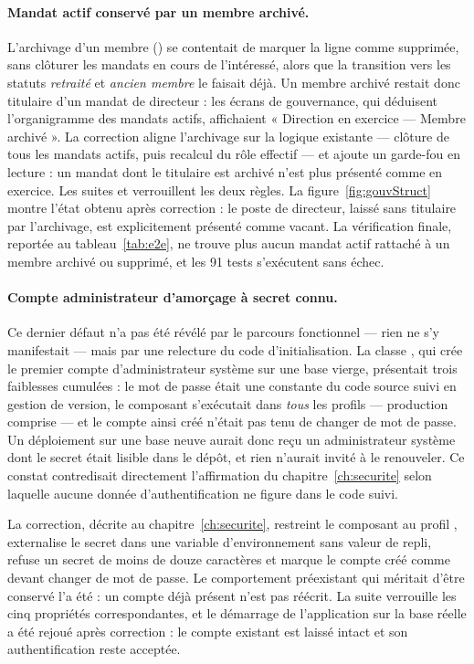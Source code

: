 \paragraph{Mandat actif conservé par un membre archivé.} L'archivage d'un membre
() se contentait de marquer la ligne comme supprimée, sans
clôturer les mandats en cours de l'intéressé, alors que la transition vers les statuts
\emph{retraité} et \emph{ancien membre} le faisait déjà. Un membre archivé restait
donc titulaire d'un mandat de directeur : les écrans de gouvernance, qui déduisent
l'organigramme des mandats actifs, affichaient « Direction en exercice --- Membre archivé ».
La correction aligne l'archivage sur la logique existante --- clôture de tous les mandats
actifs, puis recalcul du rôle effectif --- et ajoute un garde-fou en lecture : un mandat
dont le titulaire est archivé n'est plus présenté comme en exercice. Les suites
 et  verrouillent les deux règles. La
figure~\ref{fig:gouvStruct} montre l'état obtenu après correction : le poste de directeur,
laissé sans titulaire par l'archivage, est explicitement présenté comme vacant. La
vérification finale, reportée au tableau~\ref{tab:e2e}, ne trouve plus aucun mandat actif
rattaché à un membre archivé ou supprimé, et les 91 tests s'exécutent sans échec.

\paragraph{Compte administrateur d'amorçage à secret connu.} Ce dernier défaut n'a pas été
révélé par le parcours fonctionnel --- rien ne s'y manifestait --- mais par une relecture
du code d'initialisation. La classe , qui crée le premier
compte d'administrateur système sur une base vierge, présentait trois faiblesses
cumulées : le mot de passe était une constante du code source suivi en gestion de version,
le composant s'exécutait dans \emph{tous} les profils --- production comprise --- et le
compte ainsi créé n'était pas tenu de changer de mot de passe. Un déploiement sur une base
neuve aurait donc reçu un administrateur système dont le secret était lisible dans le
dépôt, et rien n'aurait invité à le renouveler. Ce constat contredisait directement
l'affirmation du chapitre~\ref{ch:securite} selon laquelle aucune donnée
d'authentification ne figure dans le code suivi.

La correction, décrite au chapitre~\ref{ch:securite}, restreint le composant au profil
, externalise le secret dans une variable d'environnement sans valeur de repli,
refuse un secret de moins de douze caractères et marque le compte créé comme devant
changer de mot de passe. Le comportement préexistant qui méritait d'être conservé l'a été :
un compte déjà présent n'est pas réécrit. La suite 
verrouille les cinq propriétés correspondantes, et le démarrage de l'application sur la
base réelle a été rejoué après correction : le compte existant est laissé intact et son
authentification reste acceptée.

